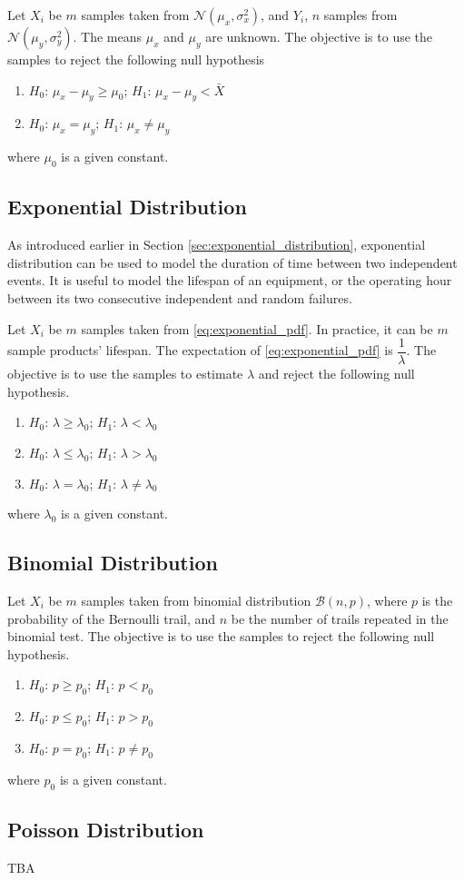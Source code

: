 Let $X_i$ be $m$ samples taken from $\mathcal{N}(\mu_x, \sigma_x^2)$, and $Y_i$, $n$ samples from $\mathcal{N}(\mu_y, \sigma_y^2)$. The means $\mu_x$ and $\mu_y$ are unknown. The objective is to use the samples to reject the following null hypothesis
\begin{enumerate}
	\item $H_0$: $\mu_x - \mu_y \geq \mu_0$; $H_1$: $\mu_x - \mu_y < \bar{X}$
	\item $H_0$: $\mu_x = \mu_y$; $H_1$: $\mu_x \neq \mu_y$
\end{enumerate} 
where $\mu_0$ is a given constant.

\subsection{Exponential Distribution}

As introduced earlier in Section \ref{sec:exponential_distribution}, exponential distribution can be used to model the duration of time between two independent events. It is useful to model the lifespan of an equipment, or the operating hour between its two consecutive independent and random failures.

Let $X_i$ be $m$ samples taken from \eqref{eq:exponential_pdf}. In practice, it can be $m$ sample products' lifespan. The expectation of \eqref{eq:exponential_pdf} is $\dfrac{1}{\lambda}$. The objective is to use the samples to estimate $\lambda$ and reject the following null hypothesis.
\begin{enumerate}
	\item $H_0$: $\lambda \geq \lambda_0$; $H_1$: $\lambda < \lambda_0$
	\item $H_0$: $\lambda \leq \lambda_0$; $H_1$: $\lambda > \lambda_0$
	\item $H_0$: $\lambda = \lambda_0$; $H_1$: $\lambda \neq \lambda_0$
\end{enumerate}
where $\lambda_0$ is a given constant.

\subsection{Binomial Distribution}

Let $X_i$ be $m$ samples taken from binomial distribution $\mathcal{B}(n,p)$, where $p$ is the probability of the Bernoulli trail, and $n$ be the number of trails repeated in the binomial test. The objective is to use the samples to reject the following null hypothesis.
\begin{enumerate}
	\item $H_0$: $p \geq p_0$; $H_1$: $p < p_0$
	\item $H_0$: $p \leq p_0$; $H_1$: $p > p_0$
	\item $H_0$: $p = p_0$; $H_1$: $p \neq p_0$
\end{enumerate}
where $p_0$ is a given constant.

\subsection{Poisson Distribution} 

TBA 